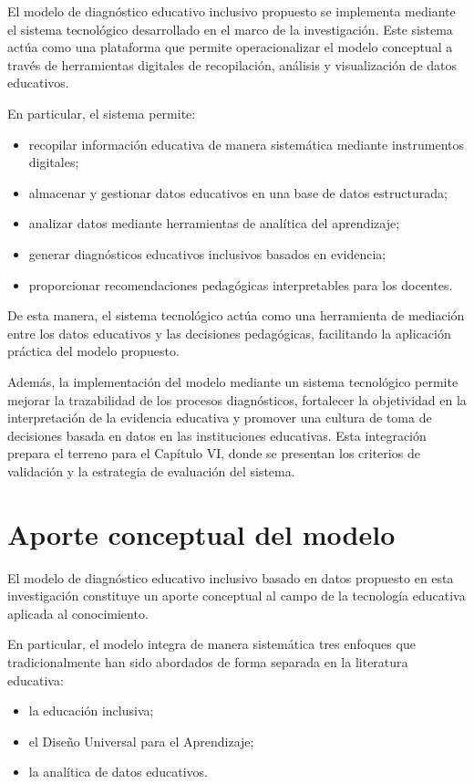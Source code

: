 \begin{refsection}
El modelo de diagnóstico educativo inclusivo propuesto se implementa mediante el sistema tecnológico desarrollado en el marco de la investigación. Este sistema actúa como una plataforma que permite operacionalizar el modelo conceptual a través de herramientas digitales de recopilación, análisis y visualización de datos educativos.

En particular, el sistema permite:

\begin{itemize}
\item recopilar información educativa de manera sistemática mediante instrumentos digitales;
\item almacenar y gestionar datos educativos en una base de datos estructurada;
\item analizar datos mediante herramientas de analítica del aprendizaje;
\item generar diagnósticos educativos inclusivos basados en evidencia;
\item proporcionar recomendaciones pedagógicas interpretables para los docentes.
\end{itemize}

De esta manera, el sistema tecnológico actúa como una herramienta de mediación entre los datos educativos y las decisiones pedagógicas, facilitando la aplicación práctica del modelo propuesto.

Además, la implementación del modelo mediante un sistema tecnológico permite mejorar la trazabilidad de los procesos diagnósticos, fortalecer la objetividad en la interpretación de la evidencia educativa y promover una cultura de toma de decisiones basada en datos en las instituciones educativas. Esta integración prepara el terreno para el Capítulo VI, donde se presentan los criterios de validación y la estrategia de evaluación del sistema.

\section{Aporte conceptual del modelo}

El modelo de diagnóstico educativo inclusivo basado en datos propuesto en esta investigación constituye un aporte conceptual al campo de la tecnología educativa aplicada al conocimiento.

En particular, el modelo integra de manera sistemática tres enfoques que tradicionalmente han sido abordados de forma separada en la literatura educativa:

\begin{itemize}
\item la educación inclusiva;
\item el Diseño Universal para el Aprendizaje;
\item la analítica de datos educativos.
\end{itemize}


\end{refsection}
